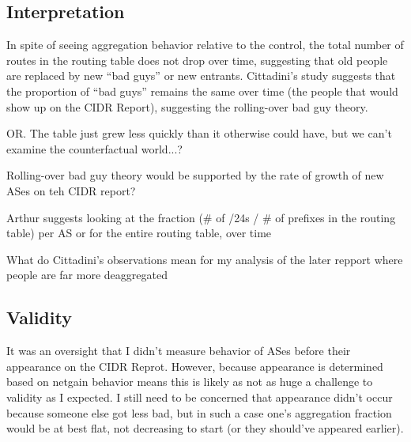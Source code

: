 
\subsection{Interpretation}

In spite of seeing aggregation behavior relative to the control, the total number of routes in the routing table does not drop over time, suggesting that old people are replaced by new ``bad guys'' or new entrants. Cittadini's study suggests that the proportion of ``bad guys'' remains the same over time (the people that would show up on the CIDR Report), suggesting the rolling-over bad guy theory.

OR. The table just grew less quickly than it otherwise could have, but we can't examine the counterfactual world...?

Rolling-over bad guy theory would be supported by the rate of growth of new ASes on teh CIDR report?

Arthur suggests looking at the fraction (# of /24s / # of prefixes in the routing table) per AS or for the entire routing table, over time

What do Cittadini's observations mean for my analysis of the later repport where people are far more deaggregated

\subsection{Validity}
It was an oversight that I didn't measure behavior of ASes before their appearance on the CIDR Reprot. However, because appearance is determined based on netgain behavior means this is likely as not as huge a challenge to validity as I expected. I still need to be concerned that appearance didn't occur because someone else got less bad, but in such a case one's aggregation fraction would be at best flat, not decreasing to start (or they should've appeared earlier).



